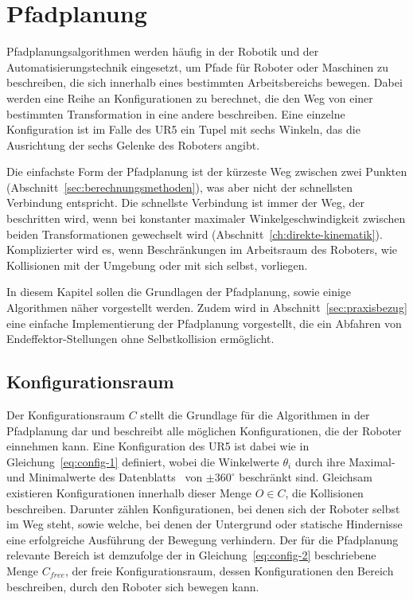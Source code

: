 \cleardoublepage


\chapter{Pfadplanung}\label{ch:pfadplanung}

Pfadplanungsalgorithmen werden häufig in der Robotik und der Automatisierungstechnik eingesetzt, um Pfade für Roboter oder Maschinen zu beschreiben, die sich innerhalb eines bestimmten Arbeitsbereichs bewegen.
Dabei werden eine Reihe an Konfigurationen zu berechnet, die den Weg von einer bestimmten Transformation in eine andere beschreiben.
Eine einzelne Konfiguration ist im Falle des UR5 ein Tupel mit sechs Winkeln, das die Ausrichtung der sechs Gelenke des Roboters angibt.

Die einfachste Form der Pfadplanung ist der kürzeste Weg zwischen zwei Punkten (Abschnitt~\ref{sec:berechnungsmethoden}), was aber nicht der schnellsten Verbindung entspricht.
Die schnellste Verbindung ist immer der Weg, der beschritten wird, wenn bei konstanter maximaler Winkelgeschwindigkeit zwischen beiden Transformationen gewechselt wird (Abschnitt~\ref{ch:direkte-kinematik}).
Komplizierter wird es, wenn Beschränkungen im Arbeitsraum des Roboters, wie Kollisionen mit der Umgebung oder mit sich selbst, vorliegen.

In diesem Kapitel sollen die Grundlagen der Pfadplanung, sowie einige Algorithmen näher vorgestellt werden.
Zudem wird in Abschnitt~\ref{sec:praxisbezug} eine einfache Implementierung der Pfadplanung vorgestellt, die ein Abfahren von Endeffektor-Stellungen ohne Selbstkollision ermöglicht.


\section{Konfigurationsraum}\label{sec:konfigurationsraum}

Der Konfigurationsraum $\mathit{C}$ stellt die Grundlage für die Algorithmen in der Pfadplanung dar und beschreibt alle möglichen Konfigurationen, die der Roboter einnehmen kann.
Eine Konfiguration des UR5 ist dabei wie in Gleichung~\ref{eq:config-1} definiert, wobei die Winkelwerte $\theta_i$ durch ihre Maximal- und Minimalwerte des Datenblatts~\cite{universalrobotsUR5TechnicalSpecifications} von $\pm 360^{\circ}$ beschränkt sind.
Gleichsam existieren Konfigurationen innerhalb dieser Menge $\mathit{O}\in\mathit{C}$, die Kollisionen beschreiben.
Darunter zählen Konfigurationen, bei denen sich der Roboter selbst im Weg steht, sowie welche, bei denen der Untergrund oder statische Hindernisse eine erfolgreiche Ausführung der Bewegung verhindern.
Der für die Pfadplanung relevante Bereich ist demzufolge der in Gleichung~\ref{eq:config-2} beschriebene Menge $\mathit{C}_{free}$, der freie Konfigurationsraum, dessen Konfigurationen den Bereich beschreiben, durch den Roboter sich bewegen kann.

